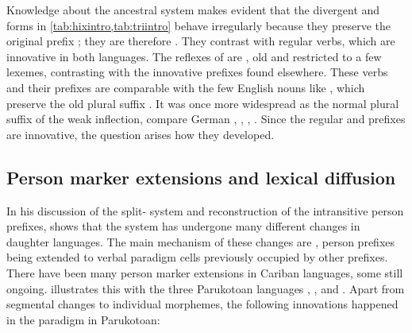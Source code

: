 Knowledge about the ancestral system makes evident that the divergent \hixka and \trio forms in \cref{tab:hixintro,tab:triintro} behave irregularly because they preserve the original \PC {} prefix ; they are therefore .
They contrast with regular  verbs, which are innovative in both languages.
The reflexes of  are , old and restricted to a few lexemes, contrasting with the innovative prefixes found elsewhere.
These verbs and their prefixes are comparable with the few English nouns like , which preserve the old plural suffix .
It was once more widespread as the normal plural suffix of the weak inflection, compare German  ,  ,  ,  .
Since the regular \hixka and \trio prefixes are innovative, the question arises how they developed.


%

\subsection{Person marker extensions and lexical diffusion}
\label{sec:extensions_intro}
In his discussion of the \PC split- system  and reconstruction of the intransitive person prefixes, \textcite[88--96]{gildea1998} shows that the system has undergone many different changes in daughter languages.
The main mechanism of these changes are , person prefixes being extended to verbal paradigm cells previously occupied by other prefixes.
There have been many person marker extensions in Cariban languages, some still ongoing.
\textcite{gildea1998} illustrates this with the three Parukotoan languages \kaxui, \hixka, and \waiwai.
Apart from segmental changes to individual morphemes, the following innovations happened in the \setone paradigm in Parukotoan:

